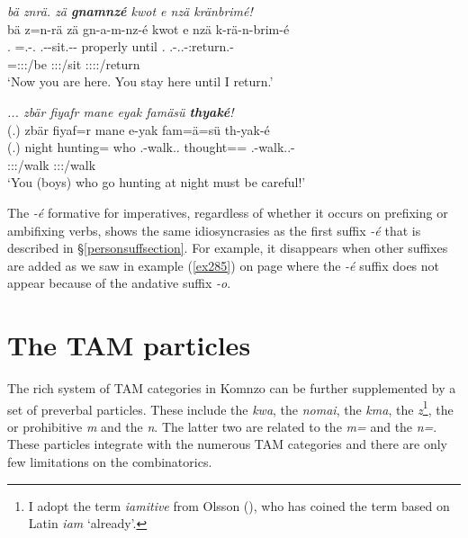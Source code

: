 \begin{exe}
	\ex \emph{bä znrä. zä \textbf{gnamnzé} kwot e nzä kränbrimé!}\\
	\glll bä z=n-rä zä gn-a-m-nz-é kwot e nzä k-rä-n-brim-é\\
	\Second.\Abs{} \Prox=\Ssg.\Alph-\Cop.\Ndu{} \Prox{} \Ssg.\Bet-\Vc-sit.\Ext-\Ndu-\Imp{} properly until \Fsg.\Abs{} \M.\Bet-\Irr.\Vc.\Ndu-\Venit:return.\Rs-\Fsg{}\\
	{} \footnotesize{\Prox=\Ssg:\Sbj:\Nonpast:\Ipfv/be} {} \footnotesize{\Ssg:\Sbj:\Imp:\Ipfv/sit} {} {} {} \footnotesize{\Fsg:\Sbj:\Irr:\Pfv:\Venit/return}\\
	\trans `Now you are here. You stay here until I return.' 
	\label{ex301}
\end{exe}
\begin{exe}
	\ex \emph{... zbär fiyafr mane eyak famäsü \textbf{thyaké}!}\\
	\glll (.) zbär fiyaf=r mane e-yak fam=ä=sü\hspace*{2cm} th-yak-é\\
	(.) night hunting=\Purp{} who \Stnsg.\Alph-walk.\Ext.\Ndu{} thought=\Assoc=\Etc{} \Stnsg.\Bet-walk.\Ext.\Ndu-\Imp\\
	{} {} {} {} \footnotesize{\Stpl:\Sbj:\Nonpast:\Ipfv/walk} {} \footnotesize{\Stpl:\Sbj:\Imp:\Ipfv/walk}\\
	\trans `You (boys) who go hunting at night must be careful!' 
	\label{ex302}
\end{exe}

The \emph{-é} formative for imperatives, regardless of whether it occurs on prefixing or ambifixing verbs, shows the same idiosyncrasies as the first   suffix \emph{-é} that is described in \S{}\ref{personsuffsection}. For example, it disappears when other suffixes are added as we saw in example (\ref{ex285}) on page \pageref{ex285} where the \emph{-é} suffix does not appear because of the andative suffix \emph{-o}.

\section{The TAM particles}\label{TAMparticlessection}

The rich system of TAM categories in Komnzo can be further supplemented by a set of preverbal particles. These include the  \emph{kwa}, the  \emph{nomai}, the  \emph{kma}, the  \emph{z}\footnote{I adopt the term \emph{iamitive} from Olsson (\citeyear{Olsson:2013vn}), who has coined the term based on Latin \emph{iam} `already'.}, the  or prohibitive \emph{m} and the  \emph{n}. The latter two are related to the   \emph{m=} and the  \emph{n=}. These particles integrate with the numerous TAM categories and there are only few limitations on the combinatorics.


